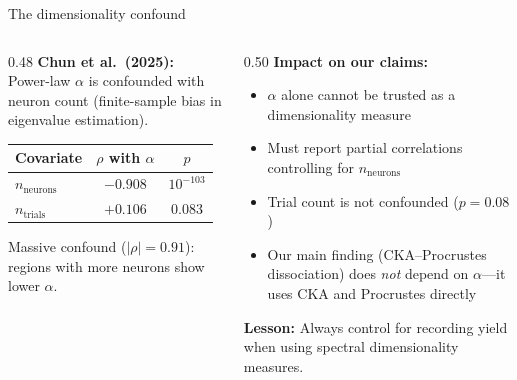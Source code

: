 \documentclass[aspectratio=169,11pt]{beamer}
\begin{document}
\begin{frame}{The dimensionality confound}
\begin{columns}[T]
\begin{column}{0.48\textwidth}
\textbf{Chun et al.\ (2025):}\\[0.2em]
{\small Power-law $\alpha$ is confounded with neuron count (finite-sample bias in eigenvalue estimation).}

\vspace{0.5em}
\centering
{\small
\begin{tabular}{lcc}
\toprule
\textbf{Covariate} & $\rho$ \textbf{with} $\alpha$ & $p$ \\
\midrule
$n_{\text{neurons}}$ & $-0.908$ & $10^{-103}$ \\
$n_{\text{trials}}$ & $+0.106$ & $0.083$ \\
\bottomrule
\end{tabular}
}

\vspace{0.3em}
{\small Massive confound ($|\rho| = 0.91$): regions with more neurons show lower $\alpha$.}
\end{column}
\begin{column}{0.50\textwidth}
\textbf{Impact on our claims:}\\[0.3em]
{\small
\begin{itemize}\setlength\itemsep{3pt}
  \item $\alpha$ alone cannot be trusted as a dimensionality measure
  \item Must report partial correlations controlling for $n_{\text{neurons}}$
  \item Trial count is not confounded ($p = 0.08$)
  \item Our main finding (CKA--Procrustes dissociation) does \emph{not} depend on $\alpha$---it uses CKA and Procrustes directly
\end{itemize}
}

\vspace{0.3em}
{\small \textbf{Lesson:} Always control for recording yield when using spectral dimensionality measures.}
\end{column}
\end{columns}
\end{frame}
\end{document}
